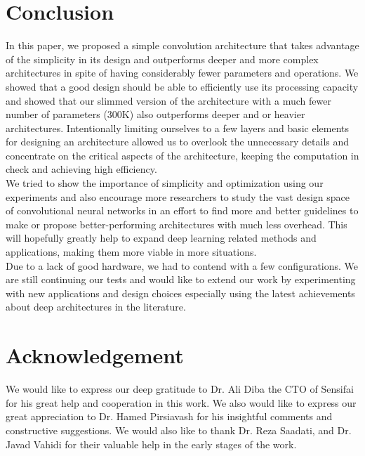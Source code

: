\documentclass{article} \usepackage{lets_keepit_simple,times}
\begin{document}
\section{Conclusion} \label{sec:conclusion}
In this paper, we proposed a simple convolution architecture that takes advantage of the simplicity in its design and outperforms deeper and more complex architectures in spite of having considerably fewer parameters and operations. We showed that a good design should be able to efficiently use its processing capacity and showed that our slimmed version of the architecture with a much fewer number of parameters (300K) also outperforms deeper and or heavier architectures. Intentionally limiting ourselves to a few layers and basic elements for designing an architecture allowed us to overlook the unnecessary details and concentrate on the critical aspects of the architecture, keeping the computation in check and achieving high efficiency.\\
We tried to show the importance of simplicity and optimization using our experiments and also encourage more researchers to study the vast design space of convolutional neural networks in an effort to find more and better guidelines to make or propose better-performing architectures with much less overhead. This will hopefully greatly help to expand deep learning related methods and applications, making them more viable in more situations.\\ 
Due to a lack of good hardware, we had to contend with a few configurations. We are still continuing our tests and would like to extend our work by experimenting with new applications and design choices especially using the latest achievements about deep architectures in the literature.

\section{Acknowledgement} \label{sec:ackn}
We would like to express our deep gratitude to Dr. Ali Diba the CTO of Sensifai for his great help and cooperation in this work. We also would like to express our great appreciation to Dr. Hamed Pirsiavash for his insightful comments and constructive suggestions. We would also like to thank Dr. Reza Saadati, and Dr. Javad Vahidi for their valuable help in the early stages of the work. 





\newpage
\renewcommand{\appendixname}{Annex}
\appendix
\end{document}
